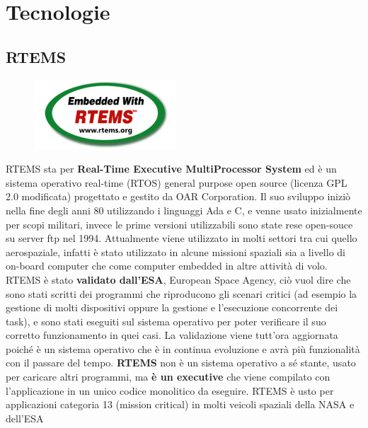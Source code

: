 \documentclass[12pt, a4paper, titlepage, oneside]{book}
\begin{document}
\chapter{Tecnologie}
\section{RTEMS}
\begin{figure}[h]
    \centering
    \includegraphics[scale = 2]{rtemslogo.png}
\end{figure}
RTEMS sta per\textbf{ Real-Time Executive MultiProcessor System} ed è un sistema operativo real-time (RTOS) general purpose open source (licenza GPL 2.0 modificata) progettato e gestito da OAR Corporation. Il suo sviluppo iniziò nella fine degli anni 80 utilizzando i linguaggi Ada e C, e venne usato inizialmente per scopi militari, invece le prime versioni utilizzabili sono state rese open-souce su server ftp nel 1994.\newline
Attualmente viene utilizzato in molti settori tra cui quello aerospaziale, infatti è stato utilizzato in alcune missioni spaziali sia a livello di on-board computer che come computer embedded in altre attività di volo.\newline
RTEMS è  stato\textbf{ validato dall'ESA}, European Space Agency, ciò vuol dire che sono stati scritti dei programmi che riproducono gli scenari critici (ad esempio la gestione di molti dispositivi oppure la gestione e l'esecuzione concorrente dei task), e sono stati eseguiti sul sistema operativo per poter verificare il suo corretto funzionamento in quei casi. La validazione viene tutt'ora aggiornata poiché è un sistema operativo che è in continua evoluzione e avrà più funzionalità con il passare del tempo.\newline
\textbf{RTEMS} non è un sistema operativo a sé stante, usato per caricare altri programmi, ma \textbf{è un executive} che viene compilato con l'applicazione in un unico codice monolitico da eseguire.\newline
RTEMS è usto per applicazioni categoria 13 (mission critical) in molti veicoli spaziali della NASA e dell'ESA
\newpage
\end{document}
